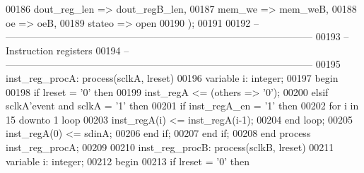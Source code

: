 \begin{DoxyCode}
00186       dout_reg_len   => dout_regB_len, 
00187       mem_we         => mem_weB, 
00188       oe             => oeB, 
00189       stateo         => \textcolor{keywordflow}{open}
00190    \textcolor{vhdlchar}{)};
00191 
00192 \textcolor{keyword}{-- ---------------------------------------------------------------------------------------------}
00193 \textcolor{keyword}{-- Instruction registers}
00194 \textcolor{keyword}{-- ---------------------------------------------------------------------------------------------}
00195 inst\_reg\_procA: \textcolor{keywordflow}{process}(sclkA, lreset)
00196    \textcolor{keywordflow}{variable} \textcolor{vhdlchar}{i}\textcolor{vhdlchar}{:} \textcolor{comment}{integer};
00197 \textcolor{vhdlkeyword}{begin}
00198    \textcolor{keywordflow}{if} \textcolor{vhdlchar}{lreset} \textcolor{vhdlchar}{=} \textcolor{vhdlchar}{'}\textcolor{vhdllogic}{}\textcolor{vhdllogic}{0}\textcolor{vhdlchar}{'} \textcolor{keywordflow}{then}
00199       inst\_regA <= (\textcolor{keywordflow}{others} => '0');
00200    \textcolor{keywordflow}{elsif} \textcolor{vhdlchar}{sclkA}\textcolor{vhdlchar}{'}\textcolor{vhdlkeyword}{event} \textcolor{keywordflow}{and} \textcolor{vhdlchar}{sclkA} \textcolor{vhdlchar}{=} \textcolor{vhdlchar}{'}\textcolor{vhdllogic}{}\textcolor{vhdllogic}{1}\textcolor{vhdlchar}{'} \textcolor{keywordflow}{then}
00201       \textcolor{keywordflow}{if} \textcolor{vhdlchar}{inst_regA_en} \textcolor{vhdlchar}{=} \textcolor{vhdlchar}{'}\textcolor{vhdllogic}{}\textcolor{vhdllogic}{1}\textcolor{vhdlchar}{'} \textcolor{keywordflow}{then}
00202          \textcolor{keywordflow}{for} \textcolor{vhdlchar}{i} \textcolor{keywordflow}{in} \textcolor{vhdllogic}{}\textcolor{vhdllogic}{15} \textcolor{keywordflow}{downto} \textcolor{vhdllogic}{}\textcolor{vhdllogic}{1} \textcolor{keywordflow}{loop}
00203             inst\_regA(i) <= inst\_regA(i-1);
00204          \textcolor{keywordflow}{end} \textcolor{keywordflow}{loop};
00205          inst\_regA(\textcolor{vhdllogic}{0}) <= sdinA;
00206       \textcolor{keywordflow}{end} \textcolor{keywordflow}{if};
00207    \textcolor{keywordflow}{end} \textcolor{keywordflow}{if};
00208 \textcolor{keywordflow}{end} \textcolor{keywordflow}{process} \textcolor{vhdlchar}{inst\_reg\_procA};
00209 
00210 inst\_reg\_procB: \textcolor{keywordflow}{process}(sclkB, lreset)
00211    \textcolor{keywordflow}{variable} \textcolor{vhdlchar}{i}\textcolor{vhdlchar}{:} \textcolor{comment}{integer};
00212 \textcolor{vhdlkeyword}{begin}
00213    \textcolor{keywordflow}{if} \textcolor{vhdlchar}{lreset} \textcolor{vhdlchar}{=} \textcolor{vhdlchar}{'}\textcolor{vhdllogic}{}\textcolor{vhdllogic}{0}\textcolor{vhdlchar}{'} \textcolor{keywordflow}{then}

\end{DoxyCode}
